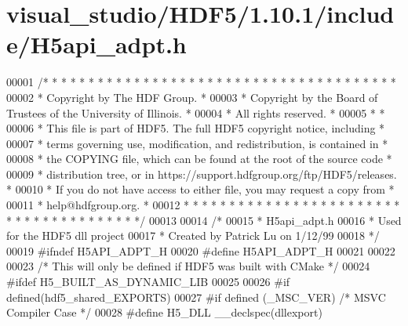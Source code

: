 \hypertarget{visual__studio_2_h_d_f5_21_810_81_2include_2_h5api__adpt_8h_source}{}\section{visual\+\_\+studio/\+H\+D\+F5/1.10.1/include/\+H5api\+\_\+adpt.h}
\label{visual__studio_2_h_d_f5_21_810_81_2include_2_h5api__adpt_8h_source}

\begin{DoxyCode}
00001 \textcolor{comment}{/* * * * * * * * * * * * * * * * * * * * * * * * * * * * * * * * * * * * * * *}
00002 \textcolor{comment}{ * Copyright by The HDF Group.                                               *}
00003 \textcolor{comment}{ * Copyright by the Board of Trustees of the University of Illinois.         *}
00004 \textcolor{comment}{ * All rights reserved.                                                      *}
00005 \textcolor{comment}{ *                                                                           *}
00006 \textcolor{comment}{ * This file is part of HDF5.  The full HDF5 copyright notice, including     *}
00007 \textcolor{comment}{ * terms governing use, modification, and redistribution, is contained in    *}
00008 \textcolor{comment}{ * the COPYING file, which can be found at the root of the source code       *}
00009 \textcolor{comment}{ * distribution tree, or in https://support.hdfgroup.org/ftp/HDF5/releases.  *}
00010 \textcolor{comment}{ * If you do not have access to either file, you may request a copy from     *}
00011 \textcolor{comment}{ * help@hdfgroup.org.                                                        *}
00012 \textcolor{comment}{ * * * * * * * * * * * * * * * * * * * * * * * * * * * * * * * * * * * * * * */}
00013 
00014 \textcolor{comment}{/*}
00015 \textcolor{comment}{ * H5api\_adpt.h}
00016 \textcolor{comment}{ * Used for the HDF5 dll project}
00017 \textcolor{comment}{ * Created by Patrick Lu on 1/12/99}
00018 \textcolor{comment}{ */}
00019 \textcolor{preprocessor}{#ifndef H5API\_ADPT\_H}
00020 \textcolor{preprocessor}{#define H5API\_ADPT\_H}
00021 
00022 
00023 \textcolor{comment}{/* This will only be defined if HDF5 was built with CMake */}
00024 \textcolor{preprocessor}{#ifdef H5\_BUILT\_AS\_DYNAMIC\_LIB}
00025 
00026 \textcolor{preprocessor}{#if defined(hdf5\_shared\_EXPORTS)}
00027 \textcolor{preprocessor}{  #if defined (\_MSC\_VER)  }\textcolor{comment}{/* MSVC Compiler Case */}\textcolor{preprocessor}{}
00028 \textcolor{preprocessor}{    #define H5\_DLL \_\_declspec(dllexport)}

\end{DoxyCode}
